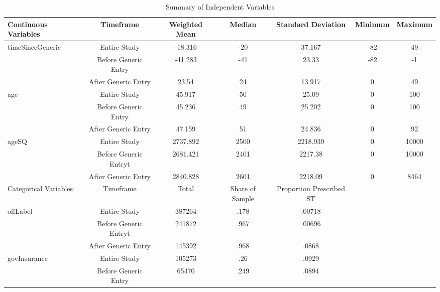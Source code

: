 \begin{table}[htbp]\centering
\def\sym#1{\ifmmode^{#1}\else\(^{#1}\)\fi}
\caption{Summary of Independent Variables\label{tab1}}
\begin{tabular}{l*{6}{c}}
\hline\hline
            Continuous Variables&\multicolumn{1}{c}{Timeframe}&\multicolumn{1}{c}{Weighted Mean}&\multicolumn{1}{c}{Median}&\multicolumn{1}{c}{Standard Deviation}&\multicolumn{1}{c}{Minimum}&\multicolumn{1}{c}{Maximum}\\
\hline
timeSinceGeneric    &     Entire Study&             -18.316&    -20&   37.167&     -82&  49\\
                    &     Before Generic Entry&     -41.283&    -41&    23.33 &     -82&  -1\\
                    &     After Generic Entry&       23.54 &    24&      13.917&     0&  49\\
[1em]
age                 &     Entire Study&             45.917&    50&    25.09 &     0&  100\\
                    &     Before Generic Entry&     45.236&    49&    25.202&     0&  100\\
                    &     After Generic Entry&      47.159&    51&    24.836&     0&  92\\
[1em]
ageSQ               &     Entire Study&             2737.892&    2500&  2218.939&     0&  10000\\
                    &     Before Generic Entryt&    2681.421&    2401&  2217.38 &     0&  10000\\
                    &     After Generic Entry&      2840.828&    2601&  2218.09 &     0&  8464\\
\hline\hline
            Categorical Variables&\multicolumn{1}{c}{Timeframe}&\multicolumn{1}{c}{Total}&\multicolumn{1}{c}{Share of Sample}&\multicolumn{1}{c}{Proportion Prescribed ST}\\
\hline
offLabel                  &     Entire Study&             387264&      .178&     .00718\\
                          &     Before Generic Entryt&    241872&      .967&     .00696\\
                          &     After Generic Entry&      145392&      .968&     .0868\\
[1em]
govInsurance              &     Entire Study&             105273&      .26 &     .0929\\
                          &     Before Generic Entry&     65470 &      .249&     .0894\\

\end{tabular}
\end{table}
